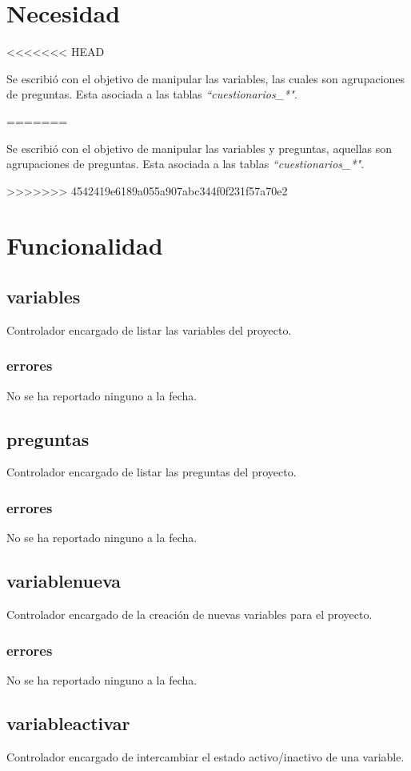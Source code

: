 \documentclass[10pt,a4paper]{book}
\begin{document}
	\section{Necesidad}
<<<<<<< HEAD

	Se escribió con el objetivo de manipular las variables, las cuales son agrupaciones de preguntas. Esta asociada a las tablas  \textit{``cuestionarios\_*"}.

=======
	
	Se escribió con el objetivo de manipular las variables y preguntas, aquellas son agrupaciones de preguntas. Esta asociada a las tablas  \textit{``cuestionarios\_*"}. 
	
>>>>>>> 4542419e6189a055a907abc344f0f231f57a70e2
	\section{Funcionalidad}

	\subsection{variables}
	Controlador encargado de listar las variables del proyecto.
	\subsubsection{errores}
	No se ha reportado ninguno a la fecha.

	\subsection{preguntas}
	Controlador encargado de listar las preguntas del proyecto.
	\subsubsection{errores}
	No se ha reportado ninguno a la fecha.

	\subsection{variablenueva}
	Controlador encargado de la creación de nuevas variables para el proyecto.
	\subsubsection{errores}
	No se ha reportado ninguno a la fecha.

	\subsection{variableactivar}
	Controlador encargado de intercambiar el estado activo/inactivo de una variable.
\end{document}
